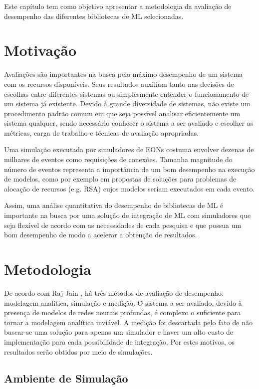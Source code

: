 Este capítulo tem como objetivo apresentar a metodologia da avaliação de desempenho das diferentes bibliotecas de ML selecionadas.

\section{Motivação}%
\label{3-motivation}

Avaliações são importantes na busca pelo máximo desempenho de um sistema com os recursos disponíveis. Seus resultados auxiliam tanto nas decisões de escolhas entre diferentes sistemas ou simplesmente entender o funcionamento de um sistema já existente. Devido à grande diversidade de sistemas, não existe um procedimento padrão comum em que seja possível analisar eficientemente um sistema qualquer, sendo necessário conhecer o sistema a ser avaliado e escolher as métricas, carga de trabalho e técnicas de avaliação apropriadas. \cite{jain1991art}

Uma simulação executada por simuladores de EONs costuma envolver dezenas de milhares de eventos como requisições de conexões. Tamanha magnitude do número de eventos representa a importância de um bom desempenho na execução de modelos, como por exemplo em propostas de soluções para problemas de alocação de recursos (e.g. RSA) cujos modelos seriam executados em cada evento.

Assim, uma análise quantitativa do desempenho de bibliotecas de ML é importante na busca por uma solução de integração de ML com simuladores que seja flexível de acordo com as necessidades de cada pesquisa e que possua um bom desempenho de modo a acelerar a obtenção de resultados.

\section{Metodologia}%
\label{3-methodology}

De acordo com Raj Jain \cite{jain1991art}, há três métodos de avaliação de desempenho: modelagem analítica, simulação e medição. O sistema a ser avaliado, devido à presença de modelos de redes neurais profundas, é complexo o suficiente para tornar a modelagem analítica inviável. A medição foi descartada pelo fato de não buscar-se uma solução para apenas um simulador e haver um alto custo de implementação para cada possibilidade de integração. Por estes motivos, os resultados serão obtidos por meio de simulações.

\subsection{Ambiente de Simulação}

